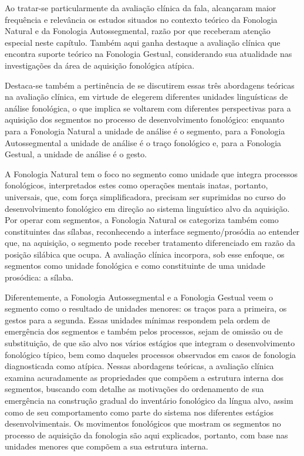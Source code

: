 \documentclass[output=paper,colorlinks,citecolor=brown,booklanguage=portuguese]{langscibook}
\begin{document}
Ao tratar-se particularmente da avaliação clínica da fala, alcançaram maior frequência e relevância os estudos situados no contexto teórico da Fonologia Natural e da Fonologia Autossegmental, razão por que receberam atenção especial neste capítulo. Também aqui ganha destaque a avaliação clínica que encontra suporte teórico na Fonologia Gestual, considerando sua atualidade nas investigações da área de aquisição fonológica atípica.

Destaca-se também a pertinência de se discutirem essas três abordagens teóricas na avaliação clínica, em virtude de elegerem diferentes unidades linguísticas de análise fonológica, o que implica se voltarem com diferentes perspectivas para a aquisição dos segmentos no processo de desenvolvimento fonológico: enquanto para a Fonologia Natural a unidade de análise é o segmento, para a Fonologia Autossegmental a unidade de análise é o traço fonológico e, para a Fonologia Gestual, a unidade de análise é o gesto.

A Fonologia Natural tem o foco no segmento como unidade que integra processos fonológicos, interpretados estes como operações mentais inatas, portanto, universais, que, com força simplificadora, precisam ser suprimidas no curso do desenvolvimento fonológico em direção ao sistema linguístico alvo da aquisição. Por operar com segmentos, a Fonologia Natural os categoriza também como constituintes das sílabas, reconhecendo a interface segmento/prosódia ao entender que, na aquisição, o segmento pode receber tratamento diferenciado em razão da posição silábica que ocupa. A avaliação clínica incorpora, sob esse enfoque, os segmentos como unidade fonológica e como constituinte de uma unidade prosódica: a sílaba.

Diferentemente, a Fonologia Autossegmental e a Fonologia Gestual veem o segmento como o resultado de unidades menores: os traços para a primeira, os gestos para a segunda. Essas unidades mínimas respondem pela ordem de emergência dos segmentos e também pelos processos, sejam de omissão ou de substituição, de que são alvo nos vários estágios que integram o desenvolvimento fonológico típico, bem como daqueles processos observados em casos de fonologia diagnosticada como atípica. Nessas abordagens teóricas, a avaliação clínica examina acuradamente as propriedades que compõem a estrutura interna dos segmentos, buscando com detalhe as motivações do ordenamento de sua emergência na construção gradual do inventário fonológico da língua alvo, assim como de seu comportamento como parte do sistema nos diferentes estágios desenvolvimentais. Os movimentos fonológicos que mostram os segmentos no processo de aquisição da fonologia são aqui explicados, portanto, com base nas unidades menores que compõem a sua estrutura interna.
\end{document}
